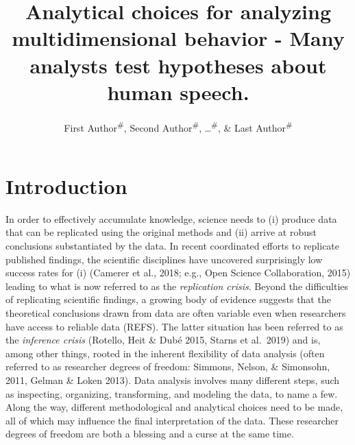 \documentclass[
  english,
  man]{apa6}
\title{Analytical choices for analyzing multidimensional behavior - Many analysts test hypotheses about human speech.}
\author{First Author\textsuperscript{\#}, Second Author\textsuperscript{\#}, \ldots{}\textsuperscript{\#}, \& Last Author\textsuperscript{\#}}
\date{}
\affiliation{\vspace{0.5cm}\textsuperscript{1} \#\\\textsuperscript{\ldots{}} \ldots{}}
\begin{document}
\maketitle

\hypertarget{introduction}{%
\section{Introduction}\label{introduction}}

In order to effectively accumulate knowledge, science needs to (i) produce data that can be replicated using the original methods and (ii) arrive at robust conclusions substantiated by the data.
In recent coordinated efforts to replicate published findings, the scientific disciplines have uncovered surprisingly low success rates for (i) (Camerer et al., 2018; e.g., Open Science Collaboration, 2015) leading to what is now referred to as the \emph{replication crisis}.
Beyond the difficulties of replicating scientific findings, a growing body of evidence suggests that the theoretical conclusions drawn from data are often variable even when researchers have access to reliable data (REFS).
The latter situation has been referred to as the \emph{inference crisis} (Rotello, Heit \& Dubé 2015, Starns et al.~2019) and is, among other things, rooted in the inherent flexibility of data analysis (often referred to as researcher degrees of freedom: Simmons, Nelson, \& Simonsohn, 2011, Gelman \& Loken 2013).
Data analysis involves many different steps, such as inspecting, organizing, transforming, and modeling the data, to name a few.
Along the way, different methodological and analytical choices need to be made, all of which may influence the final interpretation of the data.
These researcher degrees of freedom are both a blessing and a curse at the same time.
\end{document}
